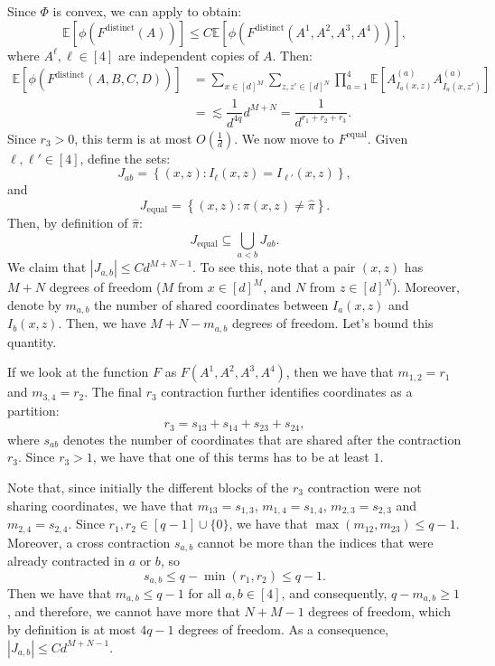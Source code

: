 \documentclass[]{article}
\makeatletter
\numberwithin{equation}{section}
\theoremstyle{definition}
\renewenvironment{proof}[1][\proofname]{\par
  \pushQED{\qed}%
  \normalfont \topsep6\p@\@plus6\p@\relax
  \trivlist
  \item[\hskip\labelsep\textbf{#1.}]\ignorespaces
}{%
  \popQED\endtrivlist\@endpefalse
}
\newcommand{\EE}{\mathbb{E}}
\makeatother
\begin{document}
\begin{proof}
Since $\Phi$ is convex, we can apply  to obtain:
\begin{equation}
    \EE \left [ \phi(F^{\mathrm{distinct}}(A))\right] \leq C \EE \left [\phi(F^{\mathrm{distinct}}(A^{1}, A^2, A^3,A^4))\right ],
\end{equation}
where $A^\ell, \ell \in [4]$ are independent copies of $A$. Then: 
\begin{align}
    \EE \left [\phi(F^{\mathrm{distinct}}(A, B, C,D))\right ] 
    & = \sum_{x \in [d]^M} \sum_{z, z' \in [d]^N} \prod_{a=1}^4 \mathbb{E} \left[ A_{I_a(x,z)}^{(a)} A_{I_a(x,z')}^{(a)} \right] \\
    & =\lesssim \dfrac{1}{d^{4q}} d^{M + N} = \dfrac{1}{d^{r_1 + r_2 + r_3}}. 
\end{align}
Since $r_3 >0$, this term is at most $O(\frac{1}{d})$.
We now move to $F^{\mathrm{equal}}$. Given $\ell, \ell' \in [4]$, define the sets: 
\begin{equation}
    J_{ab} = \left \{ (x,z): I_{\ell}(x,z) = I_{\ell'}(x,z) \right \},
\end{equation}
and 
\begin{equation}
    J_\mathrm{equal} = \left \{ (x,z): \pi(x,z) \not = \hat{\pi}\right \}. 
\end{equation}
Then, by definition of $\hat{\pi}$: 
\begin{equation}
    J_\mathrm{equal} \subseteq \bigcup_{a < b} J_{ab}.
\end{equation}
We claim that $|J_{a,b}|\leq Cd^{M+N-1}$. To see this, note that a pair $(x,z)$ has $M+N$ degrees of freedom ($M$ from $x \in [d]^{M}$, and $N$ from $z \in [d]^{N}$). 
Moreover, denote by $m_{a,b}$ the number of shared coordinates between $I_a(x,z)$ and $I_b(x,z)$. Then, we have $M +N -m_{a,b}$ degrees of freedom. Let's bound this quantity. 

If we look at the function $F$ as $F(A^1,A^2, A^3, A^4)$, then we have that $m_{1,2} = r_1$ and $m_{3,4} = r_2$. The final $r_3$ contraction further identifies coordinates as a partition: 
\begin{equation}
    r_3 = s_{13} + s_{14} +s_{23} + s_{24},
\end{equation}
where $s_{ab}$ denotes the number of coordinates that are shared after the contraction $r_3$. Since $r_3 >1$, we have that one of this terms has to be at least $1$. 

Note that, since initially the different blocks of the $r_3$ contraction were not sharing coordinates, we have that $m_{13}=s_{1,3}$, $m_{1,4}=s_{1,4}$, $m_{2,3}=s_{2,3}$ and $m_{2,4} = s_{2,4}$. Since $r_1, r_2 \in [q-1]\cup \{ 0\}$, we have that $\max(m_{12}, m_{23})\leq q-1$. Moreover, a cross contraction $s_{a,b}$ cannot be more than the indices that were already contracted in $a$ or $b$, so
\begin{equation}
    s_{a,b} \leq q- \min(r_1,r_2) \leq q-1.
\end{equation}
Then we have that $m_{a,b} \leq q-1$ for all $a,b \in [4]$, and consequently, $q-m_{a,b} \geq 1$, and therefore, we cannot have more that $N+ M - 1$ degrees of freedom, which by definition is at most $4q-1$ degrees of freedom. As a consequence, $|J_{a,b}|\leq Cd^{M+N-1}$. 


\end{proof}
\end{document}
